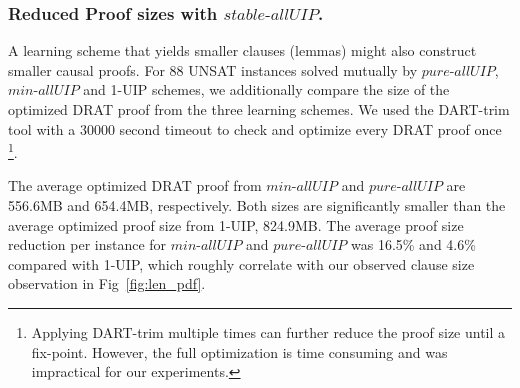 \documentclass[runningheads]{llncs}
\newcommand{\allUip}{\textit{stable-allUIP}}
\newcommand{\allUipPure}{\textit{pure-allUIP}\xspace}
\newcommand{\allUipMin}{\textit{min-allUIP}\xspace}
\newcommand{\MapleBase}{\textit{MapleCOMSPS\_LRB}}
\newcommand{\MapleIUIPPure}{\text{Maple-\allUipPure}}
\newcommand{\MapleIUIMin}{\text{Maple-\allUipMin}}
\begin{document}
\subsubsection{Reduced Proof sizes with $\allUip$.}
A learning scheme that yields smaller clauses (lemmas) might also
construct smaller causal proofs. For 88 UNSAT instances solved mutually
by $\allUipPure$, $\allUipMin$ and 1-UIP schemes, we additionally
compare the size of the optimized DRAT proof from the three learning schemes. 
We used the DART-trim tool
\cite{DBLP:conf/sat/WetzlerHH14} with a 30000 second timeout to check and
optimize every DRAT proof once \footnote{Applying DART-trim multiple
  times can further reduce the proof size until a fix-point. However,
  the full optimization is time consuming and was impractical for our
  experiments.}.

The average optimized DRAT proof from $\allUipMin$ and $\allUipPure$
are 556.6MB and 654.4MB, respectively. Both sizes are significantly
smaller than the average optimized proof size from 1-UIP, 824.9MB.
The average proof size reduction per instance for $\allUipMin$ and
$\allUipPure$ was 16.5\% and 4.6\% compared with 1-UIP, which roughly
correlate with our observed clause size observation in
Fig~\ref{fig:len_pdf}.


\end{document}

